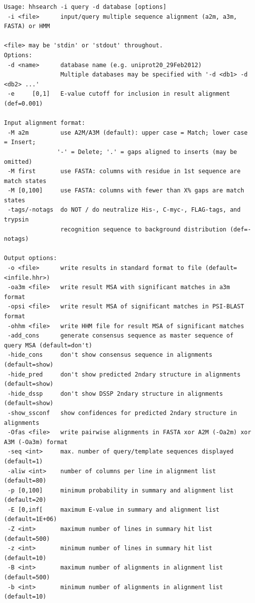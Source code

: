 \documentclass[11pt,a4paper]{article}
\begin{document}
\small 
\begin{verbatim}
Usage: hhsearch -i query -d database [options]                       
 -i <file>      input/query multiple sequence alignment (a2m, a3m, FASTA) or HMM

<file> may be 'stdin' or 'stdout' throughout.
Options:                                                                        
 -d <name>      database name (e.g. uniprot20_29Feb2012)                        
                Multiple databases may be specified with '-d <db1> -d <db2> ...'
 -e     [0,1]   E-value cutoff for inclusion in result alignment (def=0.001)       

Input alignment format:                                                       
 -M a2m         use A2M/A3M (default): upper case = Match; lower case = Insert;
               '-' = Delete; '.' = gaps aligned to inserts (may be omitted)   
 -M first       use FASTA: columns with residue in 1st sequence are match states
 -M [0,100]     use FASTA: columns with fewer than X% gaps are match states   
 -tags/-notags  do NOT / do neutralize His-, C-myc-, FLAG-tags, and trypsin 
                recognition sequence to background distribution (def=-notags)  

Output options: 
 -o <file>      write results in standard format to file (default=<infile.hhr>)
 -oa3m <file>   write result MSA with significant matches in a3m format
 -opsi <file>   write result MSA of significant matches in PSI-BLAST format
 -ohhm <file>   write HHM file for result MSA of significant matches
 -add_cons      generate consensus sequence as master sequence of query MSA (default=don't)
 -hide_cons     don't show consensus sequence in alignments (default=show)     
 -hide_pred     don't show predicted 2ndary structure in alignments (default=show)
 -hide_dssp     don't show DSSP 2ndary structure in alignments (default=show)  
 -show_ssconf   show confidences for predicted 2ndary structure in alignments
 -Ofas <file>   write pairwise alignments in FASTA xor A2M (-Oa2m) xor A3M (-Oa3m) format   
 -seq <int>     max. number of query/template sequences displayed (default=1)  
 -aliw <int>    number of columns per line in alignment list (default=80)       
 -p [0,100]     minimum probability in summary and alignment list (default=20)  
 -E [0,inf[     maximum E-value in summary and alignment list (default=1E+06)      
 -Z <int>       maximum number of lines in summary hit list (default=500)        
 -z <int>       minimum number of lines in summary hit list (default=10)        
 -B <int>       maximum number of alignments in alignment list (default=500)     
 -b <int>       minimum number of alignments in alignment list (default=10)     


\end{verbatim}
\end{document}
